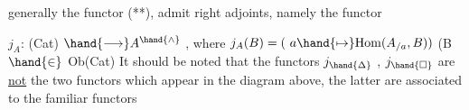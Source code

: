 
generally the functor (**), admit right adjoints, namely the functor


$j_A$: \quad (Cat) $\hand{\longrightarrow} A^{\hand{\wedge}}$ \quad , \quad where \quad $j_A(B) = (\ a \hand{\mapsto} \mathrm{Hom}(A_{/a},B))$ \quad (B $\hand{\in}$ Ob(Cat)
It should be noted that the functors \quad $j_{\hand{\Delta}}$ , $j_{\hand{\square}}$ are \uline{not} the two functors \hand{$\alpha,\beta$}
 which appear in the diagram above, \quad the latter are associated
to the familiar functors

\margin{(***)} 

